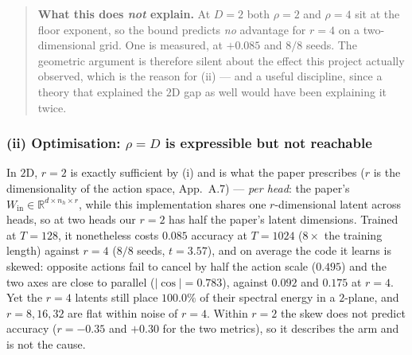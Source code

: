 \documentclass[11pt]{article}
\newcommand{\R}{\mathbb{R}}
\begin{document}
\begin{quote}\small
\textbf{What this does \emph{not} explain.} At $D=2$ both $\rho=2$ and $\rho=4$
sit at the floor exponent, so the bound predicts \emph{no} advantage for $r=4$ on
a two-dimensional grid. One is measured, at $+0.085$ and $8/8$ seeds. The
geometric argument is therefore silent about the effect this project actually
observed, which is the reason for (ii) --- and a useful discipline, since a theory
that explained the $2$D gap as well would have been explaining it twice.
\end{quote}

\subsubsection*{(ii) Optimisation: $\rho = D$ is expressible but not reachable}

In $2$D, $r=2$ is exactly sufficient by (i) and is what the paper prescribes ($r$
is the dimensionality of the action space, App.~A.7) --- \emph{per head}: the paper's
$W_{\mathrm{in}}\in\R^{d\times n_h\times r}$, while this implementation shares one
$r$-dimensional latent across heads, so at two heads our $r=2$ has half the paper's
latent dimensions. Trained at $T=128$, it nonetheless costs $0.085$ accuracy at
$T=1024$ ($8\times$ the training length) against $r=4$ ($8/8$ seeds, $t=3.57$), and on
average the code it learns is skewed: opposite actions fail to cancel by half the
action scale ($0.495$) and the two axes are close to parallel ($|\cos| = 0.783$),
against $0.092$ and $0.175$ at $r=4$. Yet the $r=4$ latents still place $100.0\%$ of
their spectral energy in a $2$-plane, and $r=8,16,32$ are flat within noise of $r=4$.
Within $r=2$ the skew does not predict accuracy ($r=-0.35$ and $+0.30$ for the two
metrics), so it describes the arm and is not the cause.
\end{document}
